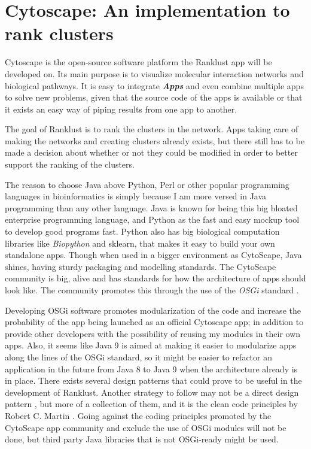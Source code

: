 \chapter{Cytoscape: An implementation to rank clusters}
Cytoscape is the open-source software platform the Ranklust app will be
developed on. Its main purpose is to visualize molecular interaction networks
and biological pathways.  It is easy to integrate \textbf{\textit{Apps}} and
even combine multiple apps to solve new problems, given that the source code of
the apps is available or that it exists an easy way of piping results from one
app to another. 

The goal of Ranklust is to rank the clusters in the network. Apps taking care of
making the networks and creating clusters already exists, but there still has to
be made a decision about whether or not they could be modified in order to
better support the ranking of the clusters.

The reason to choose Java above Python, Perl or other popular programming
languages in bioinformatics is simply because I am more versed in Java
programming than any other language. Java is known for being this big bloated
enterprise programming language, and Python as the fast and easy mockup tool to
develop good programs fast. Python also has big biological computation libraries
like \emph{Biopython} \cite{biopython} and sklearn\cite{sklearn}, that makes it
easy to build your own standalone apps. Though when used in a bigger environment
as CytoScape, Java shines, having sturdy packaging and modelling standards. The
CytoScape community is big, alive and has standards for how the architecture of
apps should look like. The community promotes this through the use of the
\emph{OSGi} standard \cite{cytoscape-osgi}.

Developing OSGi software promotes modularization \cite{modularization} of the
code and increase the probability of the app being launched as an official
Cytoscape app; in addition to provide other developers with the possibility of
reusing my modules in their own apps. Also, it seems like Java 9 is aimed at
making it easier to modularize apps along the lines of the OSGi standard, so it
might be easier to refactor an application in the future from Java 8 to Java 9
when the architecture already is in place. There exists several design patterns
that could prove to be useful in the development of Ranklust. Another strategy
to follow may not be a direct design pattern \cite{designpattern}, but more of a
collection of them, and it is the clean code principles by Robert C. Martin
\cite{cleancode}. Going against the coding principles promoted by the CytoScape
app community and exclude the use of OSGi modules will not be done, but third
party Java libraries that is not OSGi-ready might be used.

